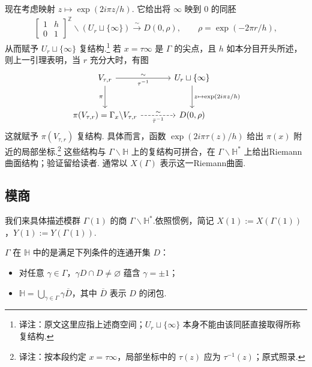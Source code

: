 现在考虑映射 $z\mapsto\exp(2i\pi z/h)$. 它给出将 $\infty$ 映到 $0$ 的同胚
\begin{align*}
\begin{bmatrix}1&h\\0&1\end{bmatrix}^{\mathbb Z}\backslash(U_r\sqcup\{\infty\})\xrightarrow{\sim}D(0,\rho),\qquad\rho=\exp(-2\pi r/h),
\end{align*}
从而赋予 $U_r\sqcup\{\infty\}$ 复结构.\footnote{译注：原文这里应指上述商空间；$U_r\sqcup\{\infty\}$ 本身不能由该同胚直接取得所称复结构.}
若 $x=\tau\infty$ 是 $\Gamma$ 的尖点，且 $h$ 如本分目开头所述，则上一引理表明，当 $r$ 充分大时，有图
\[
\begin{tikzcd}[column sep=large,row sep=large]
V_{\tau,r} \arrow[r,"\sim","\tau^{-1}"'] \arrow[d,"\pi"'] & U_r\sqcup\{\infty\} \arrow[d,"z\mapsto\exp(2i\pi z/h)"]\\
\pi(V_{\tau,r})=\Gamma_x\backslash V_{\tau,r} \arrow[r,dashed,"\sim","\bar\tau^{-1}"'] & D(0,\rho)
\end{tikzcd}
\]
这就赋予 $\pi(V_{\tau,r})$ 复结构. 具体而言，函数 $\exp(2i\pi\tau(z)/h)$ 给出 $\pi(x)$ 附近的局部坐标.\footnote{译注：按本段约定 $x=\tau\infty$，局部坐标中的 $\tau(z)$ 应为 $\tau^{-1}(z)$；原式照录.}
这些结构与 $\Gamma\backslash\mathbb H$ 上的复结构可拼合，在 $\Gamma\backslash\mathbb H^*$ 上给出Riemann曲面结构；验证留给读者. 通常以 $X(\Gamma)$ 表示这一Riemann曲面.


\subsection{模商}\label{sec:modular-1-1-5}

我们来具体描述模群 $\Gamma(1)$ 的商 $\Gamma\backslash\mathbb H^*$.依照惯例，简记 $X(1):=X(\Gamma(1))$，$Y(1):=Y(\Gamma(1))$.

\begin{definition*}

$\Gamma$ 在 $\mathbb H$ 中的是满足下列条件的连通开集 $D$：

\begin{itemize}

\item 对任意 $\gamma\in\Gamma$，$\gamma D\cap D\ne\varnothing$ 蕴含 $\gamma=\pm1$；

\item $\mathbb H=\bigcup_{\gamma\in\Gamma}\gamma\overline D$，其中 $\overline D$ 表示 $D$ 的闭包.

\end{itemize}

\end{definition*}

